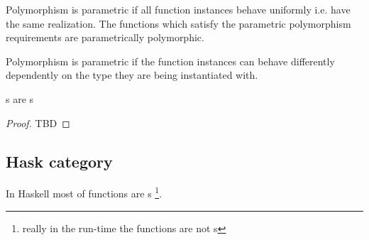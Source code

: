 \begin{definition}
\label{def:pp_function}
Polymorphism is parametric if all function instances behave uniformly
i.e. have the same realization. The functions which satisfy the
parametric polymorphism requirements are parametrically polymorphic.
\end{definition}

\begin{definition}
\label{def:ad_hoc_polymorphism}
Polymorphism is parametric if the function instances can behave
differently dependently on the type they are being instantiated with. 
\end{definition}

\begin{theorem}[Reynolds]
\label{thm:reynolds}
s are s 
\begin{proof}
TBD
\end{proof}
\end{theorem}

\subsection{\textbf{Hask} category}

In Haskell most of functions are s 
\footnote{really in the run-time the functions are not
  s}.  

